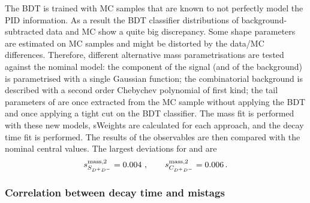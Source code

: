 The BDT is trained with MC samples that are known to not perfectly model the
PID information. As a result the BDT classifier distributions of
background-subtracted data and MC show a quite big discrepancy. Some shape
parameters are estimated on MC samples and might be distorted by the data/MC
differences. Therefore, different alternative mass parametrisations are tested
against the nominal model: the component of the \BdToDD signal (and of the
\BsToDD background) is parametrised with a single Gaussian function; the
combinatorial background is described with a second order Chebychev polynomial
of first kind; the tail parameters of \BToDsD are once extracted from the MC
sample without applying the BDT and once applying a tight cut on the BDT
classifier. The mass fit is performed with these new models, sWeights are
calculated for each approach, and the decay time fit is performed. The results
of the \CP observables are then compared with the nominal central values. The
largest deviations for \SDD and \CDD are
\begin{align*}
s_{S_{{{D}^+}{{D}^-}}}^{\text{mass,2}} = \num{0.004}\ , \qquad s_{C_{{{D}^+}{{D}^-}}}^{\text{mass,2}} = \num{0.006}\,.
\end{align*}

\subsubsection{Correlation between decay time and mistags}
\label{sec:b02dd:systematics:correlation_mistag_time}

